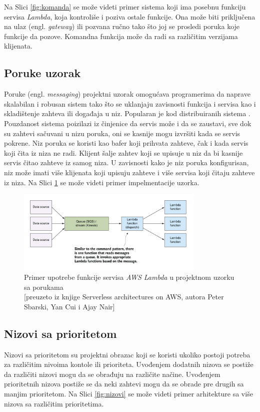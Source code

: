 \documentclass[12pt,oneside]{memoir}
\begin{document}
Na Slici \ref{fig:komanda} se može videti primer sistema koji ima posebnu funkciju servisa \emph{Lambda}, koja kontroliše i poziva ostale funkcije. Ona može biti priključena na ulaz (engl. \emph{gateway}) ili pozvana ručno tako što joj se prosledi poruka koje funkcije da pozove. Komandna funkcija može da radi sa različitim verzijama klijenata.

\subsection{Poruke uzorak} %

Poruke (engl. \emph{messaging}) projektni uzorak omogućava programerima da naprave skalabilan i robusan sistem tako što se uklanjaju zavisnosti funkcija i servisa kao i skladištenje zahteva ili događaja u niz. Popularan je kod distribuiranih sistema \cite{sa}. Pouzdanost sistema poizilazi iz činjenice da servis može i da se zaustavi, sve dok su zahtevi sačuvani u nizu poruka, oni se kasnije mogu izvršiti kada se servis pokrene. Niz poruka se koristi kao bafer koji prihvata zahteve, čak i kada servis koji čita iz niza ne radi. Klijent šalje zahtev koji se upisuje u niz da bi kasnije servis čitao zahteve iz samog niza. U zavisnosti kako je niz poruka konfigurisan, niz može imati više klijenata koji upisuju zahteve i više servisa koji čitaju zahteve iz niza. Na Slici \ref{fig:poruke} se može videti primer impelmentacije uzorka.

\begin{figure}[!ht]
  \centering
  \includegraphics[width=0.8\textwidth]{Slika 13.png}
  \caption{Primer upotrebe funkcije servisa \emph{AWS Lambda} u projektnom uzorku sa porukama\\\footnotesize[preuzeto iz knjige Serverless architectures on AWS, autora Peter Sbarski, Yan Cui i Ajay Nair]}
  \label{fig:poruke}
\end{figure}

\subsection{Nizovi sa prioritetom}
Nizovi sa prioritetom su projektni obrazac koji se koristi ukoliko postoji potreba za različitim nivoima kontole ili prioriteta. Uvođenjem dodatnih nizova se postiže da različiti nizovi mogu da se obrađuju na različite načine. Uvođenjem prioritetnih nizova postiže se da neki zahtevi mogu da se obrade pre drugih sa manjim prioritetom. Na Slici \ref{fig:nizovi} se može videti primer arhitekture sa više nizova sa različitim prioritetima.
\end{document}
